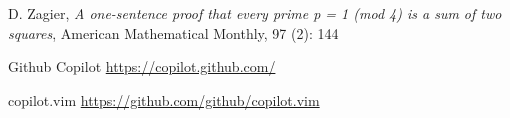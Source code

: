 \documentclass[12pt]{amsart}
\theoremstyle{plain}
\theoremstyle{definition}
\begin{document}

D. Zagier,
 \textit{A one-sentence proof that every prime p = 1 (mod 4) is a sum of two squares}, 
 American Mathematical Monthly, 97 (2): 144

 Github Copilot \url{https://copilot.github.com/}

copilot.vim \url{https://github.com/github/copilot.vim}
 

 
\end{document}
